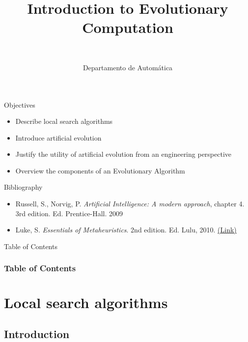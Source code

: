 \documentclass[10pt,compress]{beamer} %
\title[Introduction to Evolutionary Computation]{Introduction to Evolutionary Computation}
\author{\asignatura\\\carrera}
\institute{}
\date{Departamento de Automática}
\begin{document}
{\titlepageBlue
    \begin{frame}
        \titlepage
    \end{frame}
}

\institute{\asignatura}

\begin{frame}[plain]{}
   \begin{block}{Objectives}
       \begin{itemize}
        \item Describe local search algorithms
        \item Introduce artificial evolution
		\item Justify the utility of artificial evolution from an engineering perspective
		\item Overview the components of an Evolutionary Algorithm
       \end{itemize}
   \end{block}

   \begin{block}{Bibliography}
   		\begin{itemize}
	    \item Russell, S., Norvig, P. \textit{Artificial Intelligence: A modern approach}, chapter 4. 3rd edition. Ed. Prentice-Hall. 2009
     	\item Luke, S. \emph{Essentials of Metaheuristics}. 2nd edition. Ed. Lulu, 2010. \href{https://cs.gmu.edu/~sean/book/metaheuristics/Essentials.pdf}{(Link)}
   		\end{itemize}
   \end{block}
\end{frame}

{
\begin{frame}[shrink]{Table of Contents}
 \frametitle{Table of Contents}

    \begin{multicols}{2}
    \tableofcontents
    \end{multicols}
\end{frame}
}


\section{Local search algorithms}
\subsection{Introduction}
\end{document}
